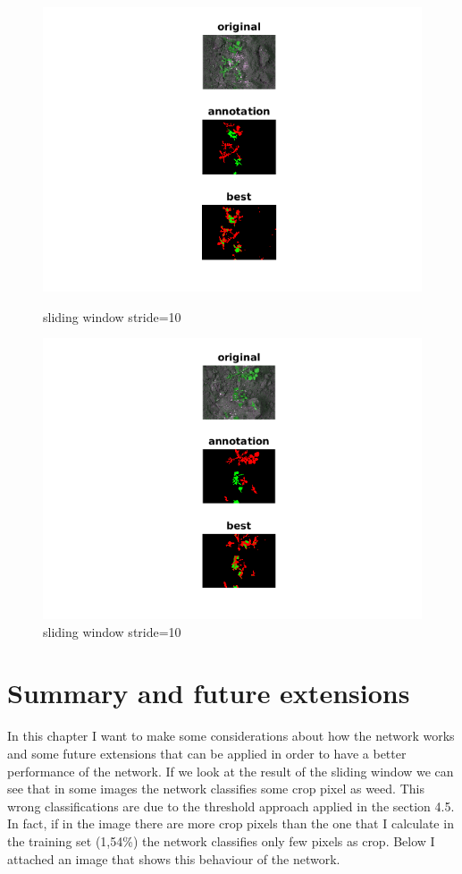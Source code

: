 \documentclass[]{report}
\begin{document}
\begin{figure}[!htb]
  \includegraphics[width=\linewidth]{2.png}
  \caption{sliding window stride=10}\label{fig: sliding window 10 1}
\endminipage\hfill
{}
  \includegraphics[width=\linewidth]{6.png}
  \caption{sliding window stride=10}\label{fig:sliding window 10 2}
\endminipage\hfill
\end{figure}


\chapter{Summary and future extensions}

In this chapter I want to make some considerations about how the network works and some future extensions that can be applied in order to have a better performance of the network.
If we look at the result of the sliding window we can see that in some images the network classifies some crop pixel as weed. This wrong classifications are due to the threshold approach applied in the section 4.5. In fact, if in the image there are more crop pixels than the one that I calculate in the training set (1,54\%) the network classifies only few pixels as crop. Below I attached an image that shows this behaviour of the network.
\end{document}
